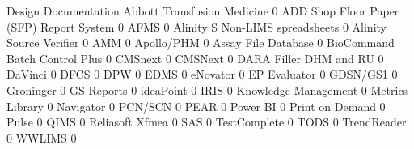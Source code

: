 \documentclass{article}
\begin{document}
\begin{Schunk}
\begin{Soutput}
                                           Design Documentation
  Abbott Transfusion Medicine                                 0
  ADD Shop Floor Paper (SFP) Report System                    0
  AFMS                                                        0
  Alinity S Non-LIMS spreadsheets                             0
  Alinity Source Verifier                                     0
  AMM                                                         0
  Apollo/PHM                                                  0
  Assay File Database                                         0
  BioCommand Batch Control Plus                               0
  CMSnext                                                     0
  CMSNext                                                     0
  DARA Filler DHM and RU                                      0
  DaVinci                                                     0
  DFCS                                                        0
  DPW                                                         0
  EDMS                                                        0
  eNovator                                                    0
  EP Evaluator                                                0
  GDSN/GS1                                                    0
  Groninger                                                   0
  GS Reports                                                  0
  ideaPoint                                                   0
  IRIS                                                        0
  Knowledge Management                                        0
  Metrics Library                                             0
  Navigator                                                   0
  PCN/SCN                                                     0
  PEAR                                                        0
  Power BI                                                    0
  Print on Demand                                             0
  Pulse                                                       0
  QIMS                                                        0
  Reliasoft Xfmea                                             0
  SAS                                                         0
  TestComplete                                                0
  TODS                                                        0
  TrendReader                                                 0
  WWLIMS                                                      0


\end{Soutput}
\end{Schunk}
\end{document}
